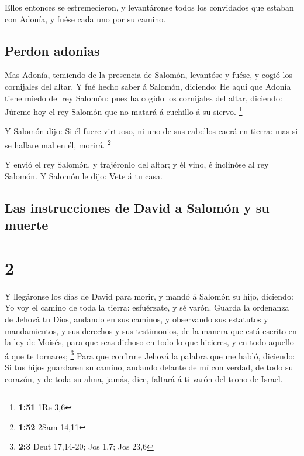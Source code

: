  Ellos entonces se estremecieron, y levantáronse todos
los convidados que estaban con Adonía, y fuése cada uno por su camino.

\hypertarget{perdon-adonias}{%
\subsection{Perdon adonias}\label{perdon-adonias}}

 Mas Adonía, temiendo de la presencia de Salomón,
levantóse y fuése, y cogió los cornijales del altar.  Y
fué hecho saber á Salomón, diciendo: He aquí que Adonía tiene miedo del
rey Salomón: pues ha cogido los cornijales del altar, diciendo: Júreme
hoy el rey Salomón que no matará á cuchillo á su siervo. \footnote{\textbf{1:51}
  1Re 3,6}

 Y Salomón dijo: Si él fuere virtuoso, ni uno de sus
cabellos caerá en tierra: mas si se hallare mal en él, morirá.
\footnote{\textbf{1:52} 2Sam 14,11}

 Y envió el rey Salomón, y trajéronlo del altar; y él
vino, é inclinóse al rey Salomón. Y Salomón le dijo: Vete á tu casa.

\hypertarget{las-instrucciones-de-david-a-salomuxf3n-y-su-muerte}{%
\subsection{Las instrucciones de David a Salomón y su
muerte}\label{las-instrucciones-de-david-a-salomuxf3n-y-su-muerte}}

\hypertarget{section-1}{%
\section{2}\label{section-1}}

 Y llegáronse los días de David para morir, y mandó á
Salomón su hijo, diciendo:  Yo voy el camino de toda la
tierra: esfuérzate, y sé varón.  Guarda la ordenanza de
Jehová tu Dios, andando en sus caminos, y observando sus estatutos y
mandamientos, y sus derechos y sus testimonios, de la manera que está
escrito en la ley de Moisés, para que seas dichoso en todo lo que
hicieres, y en todo aquello á que te tornares; \footnote{\textbf{2:3}
  Deut 17,14-20; Jos 1,7; Jos 23,6}  Para que confirme
Jehová la palabra que me habló, diciendo: Si tus hijos guardaren su
camino, andando delante de mí con verdad, de todo su corazón, y de toda
su alma, jamás, dice, faltará á ti varón del trono de Israel.

